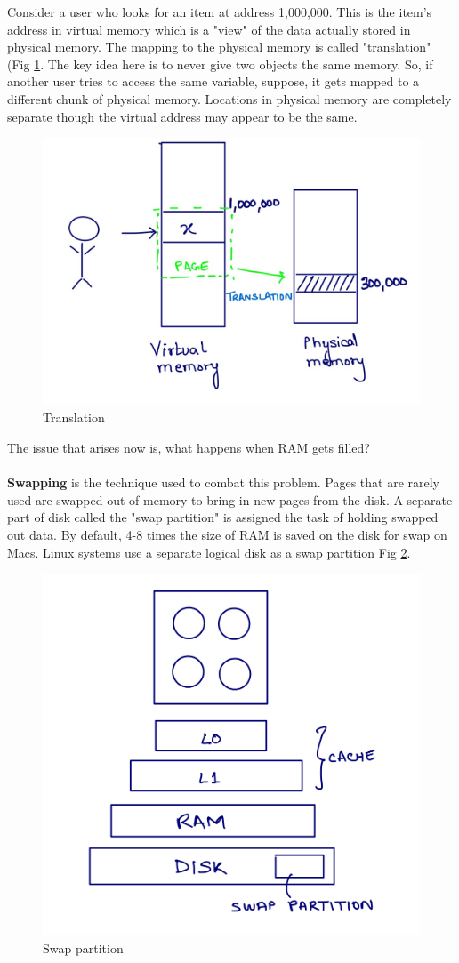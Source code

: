 \documentclass[twoside]{article}
\begin{document}
Consider a user who looks for an item at address 1,000,000. This is the item's address in virtual memory which is a "view" of the data actually stored in physical memory. The mapping to the physical memory is called "translation" (Fig \ref{fig:translation}. The key idea here is to never give two objects the same memory. So, if another user tries to access the same variable, suppose, it gets mapped to a different chunk of physical memory. Locations in physical memory are completely separate though the virtual address may appear to be the same. 

\begin{figure}[htp]
	\centering
  \includegraphics[width=0.4\linewidth]{Image-1.jpg}
  \caption{Translation}
  \label{fig:translation}
\end{figure}


The issue that arises now is, what happens when RAM gets filled?\\ \\
\textbf {Swapping} is the technique used to combat this problem. Pages that are rarely used are swapped out of memory to bring in new pages from the disk. A separate part of disk called the "swap partition" is assigned the task of holding swapped out data. By default, 4-8 times the size of RAM is saved on the disk for swap on Macs. Linux systems use a separate logical disk as a swap partition Fig \ref{fig:swap}.

\begin{figure}[htp]
	\centering
  \includegraphics[width=0.4\linewidth]{Image-1-1.png}
  \caption{Swap partition}
  \label{fig:swap}
\end{figure}
\end{document}
